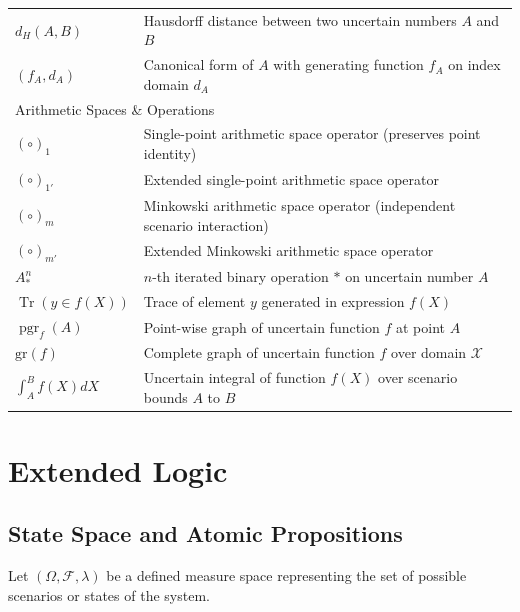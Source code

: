 \documentclass[a4paper,12pt, twoside]{memoir}
\DeclareMathOperator{\Tr}{Tr}
\DeclareMathOperator{\pgr}{pgr}
\begin{document}
\begin{table}[h!]
\begin{tabular}{p{3.5cm} p{11cm}}
		$d_H(A, B)$                          & Hausdorff distance between two uncertain numbers $A$ and $B$               \\
		$(f_A, d_A)$                         & Canonical form of $A$ with generating function $f_A$ on index domain $d_A$ \\
		\midrule
		\multicolumn{2}{l}{Arithmetic Spaces \& Operations}                                                               \\
		$(\circ)_1$                          & Single-point arithmetic space operator (preserves point identity)          \\
		$(\circ)_{1'}$                       & Extended single-point arithmetic space operator                            \\
		$(\circ)_m$                          & Minkowski arithmetic space operator (independent scenario interaction)     \\
		$(\circ)_{m'}$                       & Extended Minkowski arithmetic space operator                               \\
		$A^n_*$                              & $n$-th iterated binary operation $*$ on uncertain number $A$               \\
		$\Tr(y \in f(X))$                    & Trace of element $y$ generated in expression $f(X)$                        \\
		$\pgr_f(A)$                          & Point-wise graph of uncertain function $f$ at point $A$                    \\
		$\text{gr}(f)$                       & Complete graph of uncertain function $f$ over domain $\mathcal{X}$         \\
		$\int_{A}^{B} f(X) dX$               & Uncertain integral of function $f(X)$ over scenario bounds $A$ to $B$      \\
		\bottomrule
	\end{tabular}
\end{table}

\newpage

\chapter{Extended Logic}

\section{State Space and Atomic Propositions}
Let $(\Omega, \mathcal{F}, \lambda)$ be a defined measure space representing the set of possible scenarios or states of the system.
\end{document}
